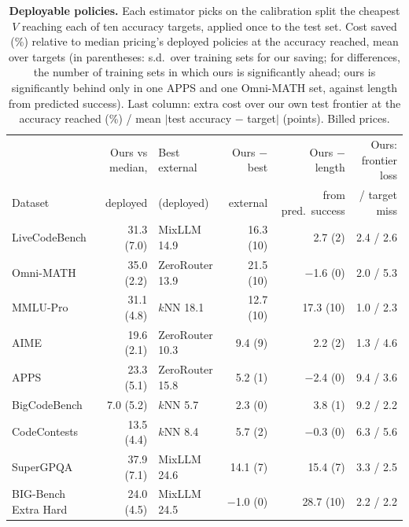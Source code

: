 \documentclass[10pt]{article}
\begin{document}
\begin{table}[t]
\centering
\footnotesize
\setlength{\tabcolsep}{3.5pt}
\begin{tabular}{lrlrrr}
\toprule
 & Ours vs median, & Best external & Ours $-$ best & Ours $-$ length & Ours: frontier loss \\
Dataset & deployed & (deployed) & external & from pred.\ success & / target miss \\
\midrule
LiveCodeBench & 31.3 (7.0) & MixLLM 14.9 & 16.3 (10) & 2.7 (2) & 2.4 / 2.6 \\
Omni-MATH & 35.0 (2.2) & ZeroRouter 13.9 & 21.5 (10) & $-$1.6 (0) & 2.0 / 5.3 \\
MMLU-Pro & 31.1 (4.8) & $k$NN 18.1 & 12.7 (10) & 17.3 (10) & 1.0 / 2.3 \\
AIME & 19.6 (2.1) & ZeroRouter 10.3 & 9.4 (9) & 2.2 (2) & 1.3 / 4.6 \\
APPS & 23.3 (5.1) & ZeroRouter 15.8 & 5.2 (1) & $-$2.4 (0) & 9.4 / 3.6 \\
BigCodeBench & 7.0 (5.2) & $k$NN 5.7 & 2.3 (0) & 3.8 (1) & 9.2 / 2.2 \\
CodeContests & 13.5 (4.4) & $k$NN 8.4 & 5.7 (2) & $-$0.3 (0) & 6.3 / 5.6 \\
SuperGPQA & 37.9 (7.1) & MixLLM 24.6 & 14.1 (7) & 15.4 (7) & 3.3 / 2.5 \\
BIG-Bench Extra Hard & 24.0 (4.5) & MixLLM 24.5 & $-$1.0 (0) & 28.7 (10) & 2.2 / 2.2 \\
\bottomrule
\end{tabular}
\caption{\textbf{Deployable policies.} Each estimator picks on the calibration split the cheapest $V$ reaching each of ten accuracy targets, applied once to the test set. Cost saved (\%) relative to median pricing's deployed policies at the accuracy reached, mean over targets (in parentheses: s.d.\ over training sets for our saving; for differences, the number of training sets in which ours is significantly ahead; ours is significantly behind only in one APPS and one Omni-MATH set, against length from predicted success). Last column: extra cost over our own test frontier at the accuracy reached (\%) / mean $|$test accuracy $-$ target$|$ (points). Billed prices.}
\label{tab:deploy}
\end{table}


\FloatBarrier
\end{document}
